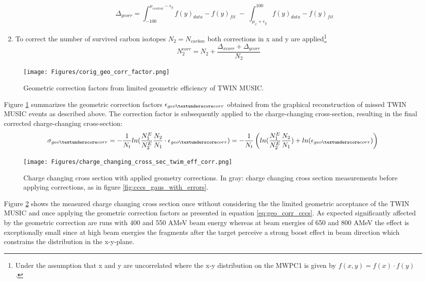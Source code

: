 \begin{enumerate}
\begin{enumerate}
\begin{equation}
\Delta_{ycorr} = \int_{-100}^{\mu_{central} - \epsilon_y} f(y)_{data} - f(y)_{fit} \; - \; \int_{\mu_x + \epsilon_y}^{100} f(y)_{data} - f(y)_{fit} 
\end{equation}
\end{enumerate}
\item To correct the number of survived carbon isotopes $N_2 = N_{carbon}$ both corrections in x and y are applied\footnote{Under the assumption that x and y are uncorrelated where the x-y distribution on the MWPC1 is given by $f(x,y) = f(x)\cdot f(y)$.}
\begin{equation}
N_2^{corr} = N_2 +\frac{\Delta_{xcorr}+\Delta_{ycorr}}{N_2}
\end{equation}
\end{enumerate}
\begin{figure}[htpb]
    \centering
    \texttt{[image: Figures/corig\_geo\_corr\_factor.png]}
    \caption{
    Geometric correction factors from limited geometric efficiency of TWIN MUSIC. 
     }
    \label{fig:geo_corr_twim}
\end{figure}
Figure \ref{fig:geo_corr_twim} summarizes the geometric correction factors $\epsilon_{geo\textunderscore corr}$ obtained from the graphical reconstruction of missed TWIN MUSIC events as described above. The correction factor is subsequently applied to the charge-changing cross-section, resulting in the final corrected charge-changing cross-section:
\begin{equation}
\sigma_{geo\textunderscore corr} = -\frac{1}{N_t} ln(\frac{N_{1}^E}{N_{2}^E}\frac{N_2}{N_1}\cdot \epsilon_{geo\textunderscore corr}) = -\frac{1}{N_t} \left( ln(\frac{N_{1}^E}{N_{2}^E}\frac{N_2}{N_1}) + ln(\epsilon_{geo\textunderscore corr})\right)
\label{eq:geo_corr_cccs}
\end{equation}
\begin{figure}[htpb]
    \centering
    \texttt{[image: Figures/charge\_changing\_cross\_sec\_twim\_eff\_corr.png]}
    \caption{
    Charge changing cross section with applied geometry corrections. In gray: charge changing cross section measurements before applying corrections, as in figure \ref{fig:cccs_gaus_with_errors}. 
     }
    \label{fig:geo_corr_cross_sec}
\end{figure}
Figure \ref{fig:geo_corr_cross_sec} shows the measured charge changing cross section once without considering the the limited geometric acceptance of the TWIN MUSIC and once applying the geometric correction factors as presented in equation \ref{eq:geo_corr_cccs}. As expected significantly affected by the  geometric correction are runs with 400 and 550 AMeV beam energy whereas at beam energies of 650 and 800 AMeV the effect is exceptionally small since at high beam energies  the fragments after the target perceive a strong boost effect in beam direction which constrains the distribution in the x-y-plane.

